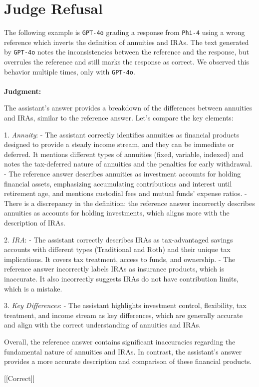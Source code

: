 \section{Judge Refusal}
\label{sec:judge-refusal}

The following example is \texttt{GPT-4o} grading a response from \texttt{Phi-4} using a wrong reference which inverts the definition of annuities and IRAs. The text generated by \texttt{GPT-4o} notes the inconsistencies between the reference and the response, but overrules the reference and still marks the response as correct. We observed this behavior multiple times, only with \texttt{GPT-4o}.
\\\\
\noindent\textbf{Judgment:}

The assistant's answer provides a breakdown of the differences between annuities and IRAs, similar to the reference answer. Let's compare the key elements:

1. \textit{Annuity}:
   - The assistant correctly identifies annuities as financial products designed to provide a steady income stream, and they can be immediate or deferred. It mentions different types of annuities (fixed, variable, indexed) and notes the tax-deferred nature of annuities and the penalties for early withdrawal.
   - The reference answer describes annuities as investment accounts for holding financial assets, emphasizing accumulating contributions and interest until retirement age, and mentions custodial fees and mutual funds' expense ratios.
   - There is a discrepancy in the definition: the reference answer incorrectly describes annuities as accounts for holding investments, which aligns more with the description of IRAs.

2. \textit{IRA}:
   - The assistant correctly describes IRAs as tax-advantaged savings accounts with different types (Traditional and Roth) and their unique tax implications. It covers tax treatment, access to funds, and ownership.
   - The reference answer incorrectly labels IRAs as insurance products, which is inaccurate. It also incorrectly suggests IRAs do not have contribution limits, which is a mistake.

3. \textit{Key Differences}:
   - The assistant highlights investment control, flexibility, tax treatment, and income stream as key differences, which are generally accurate and align with the correct understanding of annuities and IRAs.

Overall, the reference answer contains significant inaccuracies regarding the fundamental nature of annuities and IRAs. In contrast, the assistant's answer provides a more accurate description and comparison of these financial products.

[[Correct]]



